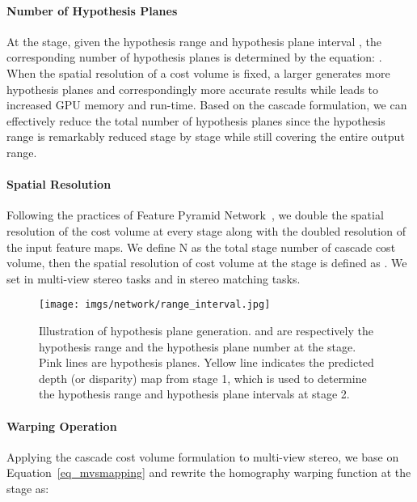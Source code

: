 \documentclass[10pt,twocolumn,letterpaper]{article}
\begin{document}
\paragraph{Number of Hypothesis Planes}\vspace{-3mm}
At the  stage, given the hypothesis range  and hypothesis plane interval , the corresponding number of hypothesis planes  is determined by the equation: .
When the spatial resolution of a cost volume is fixed, a larger  generates more hypothesis planes and correspondingly more accurate results while leads to increased GPU memory and run-time.
Based on the cascade formulation, we can effectively reduce the total number of hypothesis planes since the hypothesis range is remarkably reduced stage by stage while still covering the entire output range. 





\paragraph{Spatial Resolution}\vspace{-3mm}
Following the practices of Feature Pyramid Network~\cite{lin2017feature}, we double the spatial resolution of the cost volume at every stage along with the doubled resolution of the input feature maps. We define N as the total stage number of cascade cost volume, then the spatial resolution of cost volume at the  stage is defined as . We set  in multi-view stereo tasks and  in stereo matching tasks.  

\begin{figure}
    \centering
    \vspace{-5mm}
\texttt{[image: imgs/network/range\_interval.jpg]}
    \vspace{-3mm}
    \caption{Illustration of hypothesis plane generation.  and  are respectively the hypothesis range and the hypothesis plane number at the  stage. Pink lines are hypothesis planes. Yellow line indicates the predicted depth (or disparity) map from stage 1, which is used to determine the hypothesis range and hypothesis plane intervals at stage 2.}
    \vspace{-5mm}
    \label{fig:range_interval}
\end{figure}


\paragraph{Warping Operation}\vspace{-3mm}
Applying the cascade cost volume formulation to multi-view stereo, we base on Equation~\ref{eq_mvsmapping} and rewrite the homography warping function at the  stage as:
\vspace{-6mm}
\end{document}
